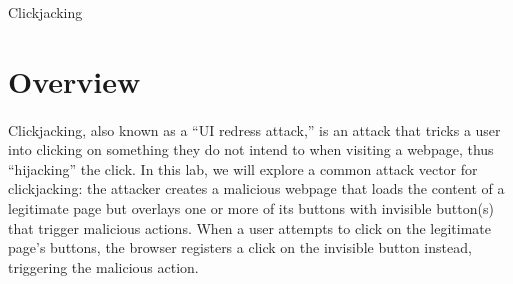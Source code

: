 





\begin{center}
{\LARGE Clickjacking}
\end{center}

\vspace{0.1in}
\vspace{0.1in}

\section{Overview}

\paragraph{} Clickjacking, also known as a ``UI redress attack,'' is an
attack that tricks a user into clicking on something they do not intend
to when visiting a webpage, thus ``hijacking'' the click. In this lab,
we will explore a common attack vector for clickjacking: the attacker
creates a malicious webpage that loads the content of a legitimate page
but overlays one or more of its buttons with invisible button(s) that
trigger malicious actions.  When a user attempts to click on the
legitimate page's buttons, the browser registers a click on the
invisible button instead, triggering the malicious action.


